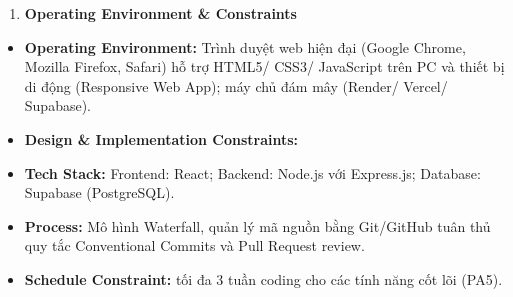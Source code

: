 \begin{enumerate}
\def\labelenumi{\arabic{enumi}.}
\setcounter{enumi}{2}
\item
  \textbf{Operating Environment \& Constraints}
\end{enumerate}

\begin{itemize}
\item
  \textbf{Operating Environment:} Trình duyệt web hiện đại (Google
  Chrome, Mozilla Firefox, Safari) hỗ trợ HTML5/ CSS3/ JavaScript trên
  PC và thiết bị di động (Responsive Web App); máy chủ đám mây (Render/
  Vercel/ Supabase).
\item
  \textbf{Design \& Implementation Constraints:}
\end{itemize}

\begin{itemize}
\item
  \textbf{Tech Stack:} Frontend: React; Backend: Node.js với Express.js;
  Database: Supabase (PostgreSQL).
\item
  \textbf{Process:} Mô hình Waterfall, quản lý mã nguồn bằng Git/GitHub
  tuân thủ quy tắc Conventional Commits và Pull Request review.
\item
  \textbf{Schedule Constraint:} tối đa 3 tuần coding cho các tính năng
  cốt lõi (PA5).
\end{itemize}

